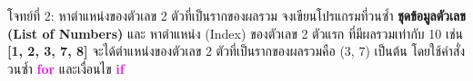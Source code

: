 \documentclass[12pt,a4paper]{article}
\newcommand{\textlight}[1]{{\thailightfont #1}}
\begin{document}
\begin{exercisebox}{โจทย์ที่ 2: หาตำแหน่งของตัวเลข 2 ตัวที่เป็นรากของผลรวม}
\textlight{จงเขียนโปรแกรมที่วนซ้ำ \textbf{ชุดข้อมูลตัวเลข (List of Numbers)} และ หาตำแหน่ง (Index) ของตัวเลข 2 ตัวแรก ที่มีผลรวมเท่ากับ 10 เช่น \textbf{[1, 2, 3, 7, 8]} จะได้ตำแหน่งของตัวเลข 2 ตัวที่เป็นรากของผลรวมคือ (3, 7) เป็นต้น โดยใช้คำสั่งวนซ้ำ \textbf{\textcolor{magenta}{for}} และเงื่อนไข \textbf{\textcolor{magenta}{if}}}
\end{exercisebox}
\end{document}
